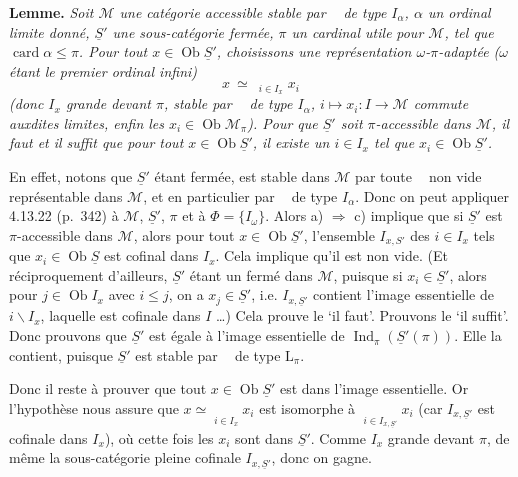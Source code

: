 \documentclass[11pt]{article}
\newcommand{\msp}[1]{\marginpar{\footnotesize [#1]}}
\newcommand{\limind}{\mathop{\underrightarrow{\mathrm{lim}}}}
\begin{document}
\textbf{Lemme.} \textit{Soit $\mathcal{M}$ une catégorie accessible stable par $\limind$ de type $I_\alpha$, $\alpha$ un ordinal limite donné, $\underline{S}'$ une sous-catégorie fermée, $\pi$ un cardinal utile}
\msp{page 17}
\textit{pour $\mathcal{M}$, tel que} $\operatorname{card}\alpha\leqslant\pi$\textit{. Pour tout $x\in\operatorname{Ob}\underline{S}'$, choisissons une représentation $\omega$-$\pi$-adaptée ($\omega$ étant le premier ordinal infini)}
\[
x\ \simeq\ \limind_{i\in I_x}x_i
\]
\textit{(donc $I_x$ grande devant $\pi$, stable par $\limind$ de type $I_\alpha$, $i\longmapsto x_i:I\longrightarrow\mathcal{M}$ commute auxdites limites, enfin les $x_i\in\operatorname{Ob}\mathcal{M}_\pi$). Pour que $\underline{S}'$ soit $\pi$-accessible dans $\mathcal{M}$, il faut et il suffit que pour tout $x\in\operatorname{Ob}\underline{S}'$, il existe un $i\in I_x$ tel que $x_i\in\operatorname{Ob}\underline{S}'$.}

En effet, notons que $\underline{S}'$ étant fermée, est stable dans $\mathcal{M}$ par toute $\limind$ non vide représentable dans $\mathcal{M}$, et en particulier par $\limind$ de type $I_\alpha$. Donc on peut appliquer 4.13.22 (p.~342) à $\mathcal{M}$, $\underline{S}'$, $\pi$ et à $\Phi=\{I_\omega\}$. Alors a) $\Longrightarrow$ c) implique que si $\underline{S}'$ est $\pi$-accessible dans $\mathcal{M}$, alors pour tout $x\in\operatorname{Ob}\underline{S}'$, l'ensemble $I_{x,S'}$ des $i\in I_x$ tels que $x_i\in\operatorname{Ob}\underline{S}$ est cofinal dans $I_x$. Cela implique qu'il est non vide. (Et réciproquement d'ailleurs, $\underline{S}'$ étant un fermé dans $\mathcal{M}$, puisque si $x_i\in\underline{S}'$, alors pour $j\in\operatorname{Ob}I_x$ avec $i\leqslant j$, on a $x_j\in\underline{S}'$, i.e. $I_{x,\underline{S}'}$ contient l'image essentielle de $i\backslash I_x$, laquelle est cofinale dans $I$ \dots) Cela prouve le `il faut'. Prouvons le `il suffit'. Donc prouvons que $\underline{S}'$ est égale à l'image essentielle de $\operatorname{Ind}_\pi(\underline{S}'(\pi))$. Elle la contient, puisque $\underline{S}'$ est stable par $\limind$ de type $\mathrm{L}_\pi$. %

\msp{page 18}
Donc il reste à prouver que tout $x\in\operatorname{Ob}\underline{S}'$ est dans l'image essentielle. Or l'hypothèse nous assure que $x\simeq\limind\limits_{i\in I_x}x_i$ est isomorphe à $\limind\limits_{i\in I_{x,\underline{S}'}}x_i$ (car $I_{x,\underline{S}'}$ est cofinale dans $I_x$), où cette fois les $x_i$ sont dans $\underline{S}'$. Comme $I_x$ grande devant $\pi$, de même la sous-catégorie pleine cofinale $I_{x,\underline{S}'}$, donc on gagne.
\end{document}
